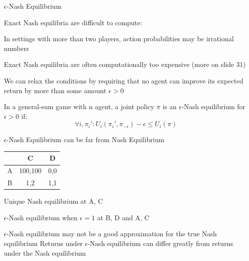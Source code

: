     

\begin{frame}{\(\epsilon\)-Nash Equilibrium}

    Exact Nash equilibria are difficult to compute: 

    \blist
        \item In settings with more than two players, action probabilities may be irrational numbers
        \item Exact Nash equilibria are often computationally too expensive (more on slide 31)
        \item We can relax the conditions by requiring that no agent can improve its expected return by more than some amount $\epsilon > 0$
        \item In a general-sum game with n agent, a joint policy $\pi$ is an $\epsilon$-Nash equilibrium for $\epsilon > 0$ if:
    \elist
    \begin{equation*}
        \forall i, \pi_{i}': U_{i}(\pi_{i}', \pi_{-i})-\epsilon \le U_i(\pi)
    \end{equation*}

\end{frame}

\begin{frame}{$\epsilon$-Nash Equilibrium can be far from Nash Equilibrium}

    \centering
    \begin{tabular}[b]{c|c|c}
    & C & D \\
    \hline
    A & 100,100 & 0,0 \\
    \hline
    B & 1,2 & 1,1 \\
    \end{tabular}
    \vspace{10pt}
    
    \blist
        \item Unique Nash equilibrium at A, C
        \item \(\epsilon\)-Nash equilibrium when \(\epsilon = 1\) at B, D and A, C
        \item \(\epsilon\)-Nash equilibrium may not be a good approximation for the true Nash equilibrium
        \listtab Returns under $\epsilon$-Nash equilibrium can differ greatly from returns under the Nash equilibrium
    \elist
\end{frame}

